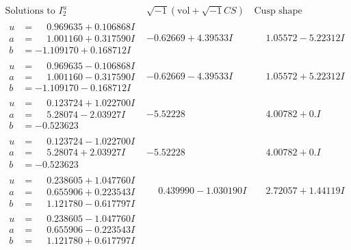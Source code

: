 \documentclass[1p]{elsarticle_modified}
\theoremstyle{definition}
\newcommand{\I}{\sqrt{-1}}
\begin{document}
$$\begin{array}{c|c|c}  
\text{Solutions to }I^u_{2}& \I (\text{vol} + \sqrt{-1}CS) & \text{Cusp shape}\\
 \hline 
\begin{aligned}
u &= \phantom{-}0.969635 + 0.106868 I \\
a &= \phantom{-}1.001160 + 0.317590 I \\
b &= -1.109170 + 0.168712 I\end{aligned}
 & -0.62669 + 4.39533 I & \phantom{-}1.05572 - 5.22312 I \\ \hline\begin{aligned}
u &= \phantom{-}0.969635 - 0.106868 I \\
a &= \phantom{-}1.001160 - 0.317590 I \\
b &= -1.109170 - 0.168712 I\end{aligned}
 & -0.62669 - 4.39533 I & \phantom{-}1.05572 + 5.22312 I \\ \hline\begin{aligned}
u &= \phantom{-}0.123724 + 1.022700 I \\
a &= \phantom{-}5.28074 - 2.03927 I \\
b &= -0.523623\phantom{ +0.000000I}\end{aligned}
 & -5.52228\phantom{ +0.000000I} & \phantom{-}4.00782 + 0. I\phantom{ +0.000000I} \\ \hline\begin{aligned}
u &= \phantom{-}0.123724 - 1.022700 I \\
a &= \phantom{-}5.28074 + 2.03927 I \\
b &= -0.523623\phantom{ +0.000000I}\end{aligned}
 & -5.52228\phantom{ +0.000000I} & \phantom{-}4.00782 + 0. I\phantom{ +0.000000I} \\ \hline\begin{aligned}
u &= \phantom{-}0.238605 + 1.047760 I \\
a &= \phantom{-}0.655906 + 0.223543 I \\
b &= \phantom{-}1.121780 - 0.617797 I\end{aligned}
 & \phantom{-}0.439990 - 1.030190 I & \phantom{-}2.72057 + 1.44119 I \\ \hline\begin{aligned}
u &= \phantom{-}0.238605 - 1.047760 I \\
a &= \phantom{-}0.655906 - 0.223543 I \\
b &= \phantom{-}1.121780 + 0.617797 I\end{aligned}

\end{array}$$
\end{document}
